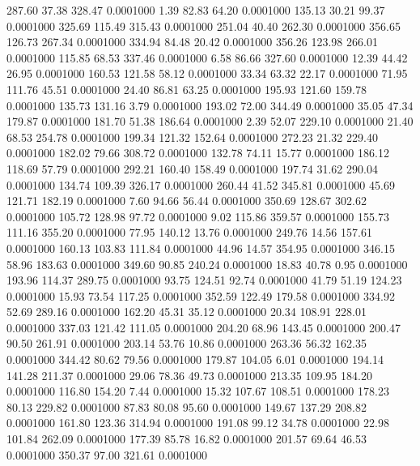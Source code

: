  287.60   37.38  328.47   0.0001000
   1.39   82.83   64.20   0.0001000
 135.13   30.21   99.37   0.0001000
 325.69  115.49  315.43   0.0001000
 251.04   40.40  262.30   0.0001000
 356.65  126.73  267.34   0.0001000
 334.94   84.48   20.42   0.0001000
 356.26  123.98  266.01   0.0001000
 115.85   68.53  337.46   0.0001000
   6.58   86.66  327.60   0.0001000
  12.39   44.42   26.95   0.0001000
 160.53  121.58   58.12   0.0001000
  33.34   63.32   22.17   0.0001000
  71.95  111.76   45.51   0.0001000
  24.40   86.81   63.25   0.0001000
 195.93  121.60  159.78   0.0001000
 135.73  131.16    3.79   0.0001000
 193.02   72.00  344.49   0.0001000
  35.05   47.34  179.87   0.0001000
 181.70   51.38  186.64   0.0001000
   2.39   52.07  229.10   0.0001000
  21.40   68.53  254.78   0.0001000
 199.34  121.32  152.64   0.0001000
 272.23   21.32  229.40   0.0001000
 182.02   79.66  308.72   0.0001000
 132.78   74.11   15.77   0.0001000
 186.12  118.69   57.79   0.0001000
 292.21  160.40  158.49   0.0001000
 197.74   31.62  290.04   0.0001000
 134.74  109.39  326.17   0.0001000
 260.44   41.52  345.81   0.0001000
  45.69  121.71  182.19   0.0001000
   7.60   94.66   56.44   0.0001000
 350.69  128.67  302.62   0.0001000
 105.72  128.98   97.72   0.0001000
   9.02  115.86  359.57   0.0001000
 155.73  111.16  355.20   0.0001000
  77.95  140.12   13.76   0.0001000
 249.76   14.56  157.61   0.0001000
 160.13  103.83  111.84   0.0001000
  44.96   14.57  354.95   0.0001000
 346.15   58.96  183.63   0.0001000
 349.60   90.85  240.24   0.0001000
  18.83   40.78    0.95   0.0001000
 193.96  114.37  289.75   0.0001000
  93.75  124.51   92.74   0.0001000
  41.79   51.19  124.23   0.0001000
  15.93   73.54  117.25   0.0001000
 352.59  122.49  179.58   0.0001000
 334.92   52.69  289.16   0.0001000
 162.20   45.31   35.12   0.0001000
  20.34  108.91  228.01   0.0001000
 337.03  121.42  111.05   0.0001000
 204.20   68.96  143.45   0.0001000
 200.47   90.50  261.91   0.0001000
 203.14   53.76   10.86   0.0001000
 263.36   56.32  162.35   0.0001000
 344.42   80.62   79.56   0.0001000
 179.87  104.05    6.01   0.0001000
 194.14  141.28  211.37   0.0001000
  29.06   78.36   49.73   0.0001000
 213.35  109.95  184.20   0.0001000
 116.80  154.20    7.44   0.0001000
  15.32  107.67  108.51   0.0001000
 178.23   80.13  229.82   0.0001000
  87.83   80.08   95.60   0.0001000
 149.67  137.29  208.82   0.0001000
 161.80  123.36  314.94   0.0001000
 191.08   99.12   34.78   0.0001000
  22.98  101.84  262.09   0.0001000
 177.39   85.78   16.82   0.0001000
 201.57   69.64   46.53   0.0001000
 350.37   97.00  321.61   0.0001000
